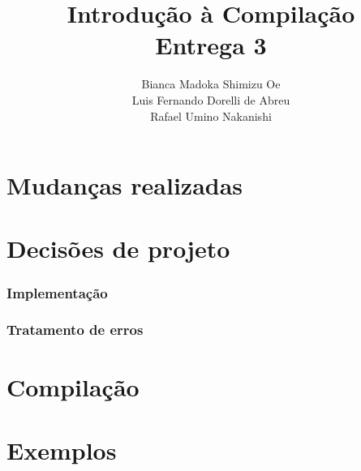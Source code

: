 \documentclass{article}
\title{Introdução à Compilação\\Entrega 3}
\author{Bianca Madoka Shimizu Oe\\
		Luis Fernando Dorelli de Abreu\\
		Rafael Umino Nakanishi}
\date{}
\begin{document}
\maketitle

\begin{abstract}
\end{abstract}

\section{Mudanças realizadas} %
\label{sec:mudan_as_realizadas}


\section{Decisões de projeto} %
\label{sec:decis_es_de_projeto}
	\subsubsection{Implementação} %
	\label{ssub:implementa_o}
	

	\subsubsection{Tratamento de erros} %
	\label{ssub:tratamento_de_erros}
	

\section{Compilação} %
\label{sec:compila_o}


\section{Exemplos} %
\label{sec:exemplos}

\end{document}
